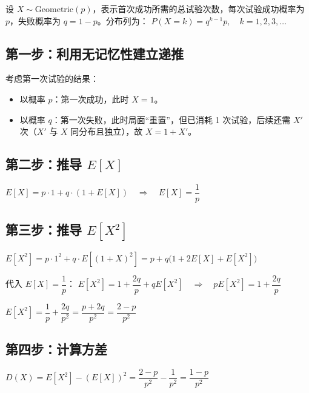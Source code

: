 \clearpage

设 $X \sim \text{Geometric}(p)$，表示首次成功所需的总试验次数，每次试验成功概率为 $p$，失败概率为 $q = 1-p$。分布列为：
$
P(X=k) = q^{k-1} p, \quad k=1,2,3,\dots
$

\subsection*{第一步：利用无记忆性建立递推}

考虑第一次试验的结果：
\begin{itemize}
    \item 以概率 $p$：第一次成功，此时 $X=1$。
    \item 以概率 $q$：第一次失败，此时局面“重置”，但已消耗 1 次试验，后续还需 $X'$ 次（$X'$ 与 $X$ 同分布且独立），故 $X = 1 + X'$。
\end{itemize}

\subsection*{第二步：推导 $E[X]$ }
$
E[X] = p\cdot1 + q\cdot(1+E[X]) \quad\Rightarrow\quad E[X]=\dfrac{1}{p}
$

\subsection*{第三步：推导 $E[X^2]$}
$
E[X^2] = p\cdot1^2 + q\cdot E[(1+X)^2] = p + q\bigl(1+2E[X]+E[X^2]\bigr)
$

代入 $E[X]=\dfrac{1}{p}$：
$
E[X^2] = 1 + \dfrac{2q}{p} + qE[X^2] \quad\Rightarrow\quad pE[X^2] = 1 + \dfrac{2q}{p}
$

$
E[X^2] = \dfrac{1}{p} + \dfrac{2q}{p^2} = \dfrac{p+2q}{p^2} = \dfrac{2-p}{p^2}
$

\subsection*{第四步：计算方差}
$
D(X) = E[X^2] - (E[X])^2 = \dfrac{2-p}{p^2} - \dfrac{1}{p^2} = \dfrac{1-p}{p^2}
$

